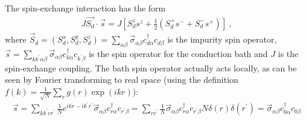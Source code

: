 \documentclass[10pt]{report}
\numberwithin{equation}{section}
\begin{document}
The spin-exchange interaction has the form
\begin{equation}\begin{aligned}
	J \vec{S_d}\cdot\vec{s} = J \left[S_d^z s^z + \frac{1}{2}\left( S_d^+ s^- + S_d^- s^+ \right) \right] ~,
\end{aligned}\end{equation}
where \(\vec S_d = \left(S_d^x, S_d^y, S_d^z\right) = \sum_{\alpha\beta}\vec \sigma_{\alpha\beta}c^\dagger_{d\alpha}c_{d\beta}\) is the impurity spin operator, \(\vec s = \sum_{kk^\prime\alpha\beta}\vec \sigma_{\alpha\beta}c^\dagger_{k\alpha}c_{k^\prime\beta}\) is the spin operator for the conduction bath and \(J\) is the spin-exchange coupling. The bath spin operator actually acts locally, as can be seen by Fourier transforming to real space (using the definition \(f(k) = \frac{1}{\sqrt N}\sum_r g(r)\exp(ikr)\)):
\begin{equation}\begin{aligned}
	\vec s = \sum_{k k^\prime r r^\prime} \frac{1}{N} e^{ikr - ik^\prime r^\prime} \vec \sigma_{\alpha\beta} c^\dagger_{r\alpha} c_{r^\prime\beta} = \sum_{rr^\prime}\frac{1}{N}\vec \sigma_{\alpha\beta} c^\dagger_{r\alpha} c_{r^\prime\beta} N \delta(r)\delta(r^\prime) = \vec \sigma_{\alpha\beta} c^\dagger_{0\alpha} c_{0\beta}
\end{aligned}\end{equation}
\end{document}
